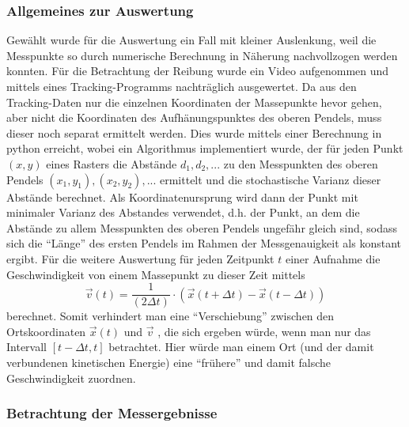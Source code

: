 \subsubsection{Allgemeines zur Auswertung}
Gewählt wurde für die Auswertung ein Fall mit kleiner Auslenkung, weil die Messpunkte so durch numerische Berechnung in Näherung nachvollzogen werden konnten.
Für die Betrachtung der Reibung wurde ein Video aufgenommen und mittels eines Tracking-Programms nachträglich ausgewertet. 
Da aus den Tracking-Daten nur die einzelnen Koordinaten der Massepunkte hevor gehen, aber nicht die Koordinaten des Aufhänungspunktes des oberen Pendels, muss dieser noch separat ermittelt werden. Dies wurde mittels einer Berechnung in python erreicht, wobei ein Algorithmus implementiert wurde, der für jeden Punkt $(x, y)$ eines Rasters die Abstände $d_1, d_2, ... $ zu den Messpunkten des oberen Pendels $(x_1, y_1), (x_2, y_2), ...$ ermittelt und die stochastische Varianz dieser Abstände berechnet. Als Koordinatenursprung wird dann der Punkt mit minimaler Varianz des Abstandes verwendet, d.h. der Punkt, an dem die Abstände zu allem Messpunkten des oberen Pendels ungefähr gleich sind, sodass sich die \enquote{Länge} des ersten Pendels im Rahmen der Messgenauigkeit als konstant ergibt.  
Für die weitere Auswertung für jeden Zeitpunkt $ t $ einer Aufnahme die Geschwindigkeit von einem Massepunkt zu dieser Zeit mittels
\begin{equation}
\vec{v}(t) = \frac{1}{(2 \Delta t)} \cdot (\vec{x}(t+\Delta t) - \vec{x}(t-\Delta t))
\end{equation} 
berechnet. 
Somit verhindert man eine \enquote{Verschiebung} zwischen den Ortskoordinaten $  \vec{x} (t) $ und $ \vec{v} $ , die sich ergeben würde, wenn man nur das Intervall $ [t - \Delta t, t] $ betrachtet. Hier würde man einem Ort (und der damit verbundenen kinetischen Energie) eine \enquote{frühere} und damit falsche Geschwindigkeit zuordnen. 
\subsubsection{Betrachtung der Messergebnisse}


